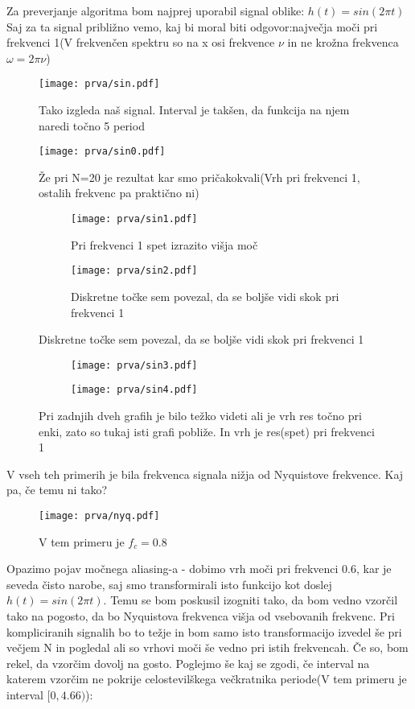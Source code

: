 \documentclass{article}
\begin{document}
Za preverjanje algoritma bom najprej uporabil signal oblike:
$h(t) = sin(2\pi t)$
Saj za ta signal približno vemo, kaj bi moral biti odgovor:največja moči pri frekvenci 1(V frekvenčen spektru so na x osi frekvence $\nu$ in ne krožna frekvenca $\omega = 2\pi\nu$)
\begin{figure}[H]
\texttt{[image: prva/sin.pdf]}
\caption*{Tako izgleda naš signal. Interval je takšen, da funkcija na njem naredi točno 5 period}
\end{figure}
\begin{figure}[H]
\texttt{[image: prva/sin0.pdf]}
\caption*{Že pri N=20 je rezultat kar smo pričakokvali(Vrh pri frekvenci 1, ostalih frekvenc pa praktično ni)}
\end{figure}
\begin{figure}[H]
\begin{subfigure}{.5\textwidth}
\texttt{[image: prva/sin1.pdf]}
\caption*{Pri frekvenci 1 spet izrazito višja moč}
\end{subfigure}
\begin{subfigure}{.5\textwidth}
\texttt{[image: prva/sin2.pdf]}
\caption*{Diskretne točke sem povezal, da se boljše vidi skok pri frekvenci 1}
\end{subfigure}
\end{figure}
\begin{figure}[H]
\begin{subfigure}{.5\textwidth}
\texttt{[image: prva/sin3.pdf]}
\end{subfigure}
\begin{subfigure}{.5\textwidth}
\texttt{[image: prva/sin4.pdf]}
\end{subfigure}
\caption*{Pri zadnjih dveh grafih je bilo težko videti ali je vrh res točno pri enki, zato so tukaj isti grafi pobliže. In vrh je res(spet) pri frekvenci 1}
\end{figure}
\newpage
V vseh teh primerih je bila frekvenca signala nižja od Nyquistove frekvence. Kaj pa, če temu ni tako?

\begin{figure}[H]
\texttt{[image: prva/nyq.pdf]}
\caption*{V tem primeru je $f_c = 0.8$}
\end{figure}

Opazimo pojav močnega aliasing-a - dobimo vrh moči pri frekvenci 0.6, kar je seveda čisto narobe, saj smo transformirali isto funkcijo kot doslej $h(t) = sin(2\pi t)$. Temu se bom poskusil izogniti tako, da bom vedno vzorčil tako na pogosto, da bo Nyquistova frekvenca višja od vsebovanih frekvenc. Pri kompliciranih signalih bo to težje in bom samo isto transformacijo izvedel še pri večjem N in pogledal ali so vrhovi moči še vedno pri istih frekvencah. Če so, bom rekel, da vzorčim dovolj na gosto.
\newpage
Poglejmo še kaj se zgodi, če interval na katerem vzorčim ne pokrije celostevilškega večkratnika periode(V tem primeru je interval $[0,4.66)$):
\end{document}
